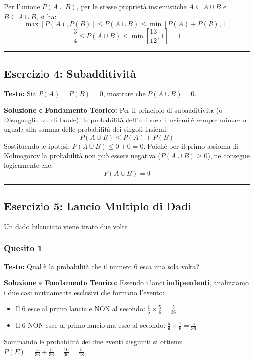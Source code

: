\documentclass[12pt, a4paper]{article}
\begin{document}
Per l'unione $P(A \cup B)$, per le stesse proprietà insiemistiche $A \subseteq A \cup B$ e $B \subseteq A \cup B$, si ha:
$$ \max[P(A), P(B)] \le P(A \cup B) \le \min[P(A) + P(B), 1] $$
$$ \frac{3}{4} \le P(A \cup B) \le \min\left[\frac{13}{12}, 1\right] = 1 $$

\vspace{0.5cm}\hrule\vspace{0.5cm}

\subsection*{Esercizio 4: Subadditività}
\textbf{Testo:} Sia $P(A)=P(B)=0$, mostrare che $P(A \cup B)=0$.

\textbf{Soluzione e Fondamento Teorico:} 
Per il principio di subadditività (o Disuguaglianza di Boole), la probabilità dell'unione di insiemi è sempre minore o uguale alla somma delle probabilità dei singoli insiemi:
$$ P(A \cup B) \le P(A) + P(B) $$
Sostituendo le ipotesi: $P(A \cup B) \le 0 + 0 = 0$.
Poiché per il primo assioma di Kolmogorov la probabilità non può essere negativa ($P(A \cup B) \ge 0$), ne consegue logicamente che:
$$ P(A \cup B) = 0 $$

\vspace{0.5cm}\hrule\vspace{0.5cm}

\subsection*{Esercizio 5: Lancio Multiplo di Dadi}
Un dado bilanciato viene tirato due volte.

\subsubsection*{Quesito 1}
\textbf{Testo:} Qual è la probabilità che il numero 6 esca una sola volta?

\textbf{Soluzione e Fondamento Teorico:} 
Essendo i lanci \textbf{indipendenti}, analizziamo i due casi mutuamente esclusivi che formano l'evento:
\begin{itemize}
    \item Il 6 esce al primo lancio e NON al secondo: $\frac{1}{6} \times \frac{5}{6} = \frac{5}{36}$
    \item Il 6 NON esce al primo lancio ma esce al secondo: $\frac{5}{6} \times \frac{1}{6} = \frac{5}{36}$
\end{itemize}
Sommando le probabilità dei due eventi disgiunti si ottiene: $P(E) = \frac{5}{36} + \frac{5}{36} = \frac{10}{36} = \frac{5}{18}$.
\end{document}
